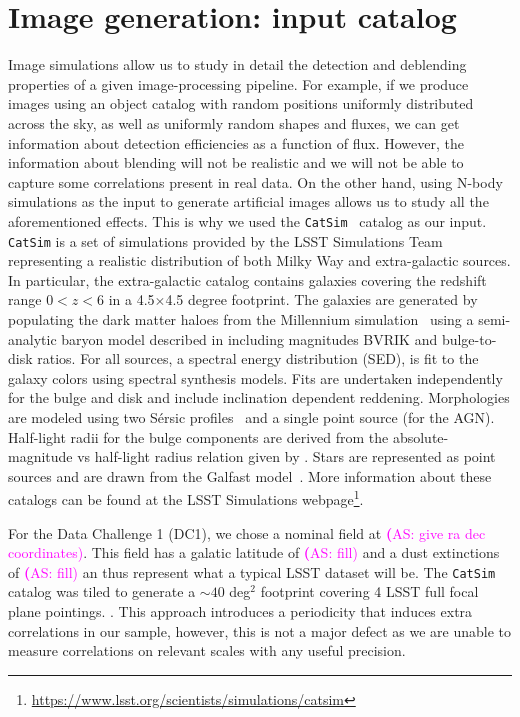 \documentclass[twocolumn]{aastex62}
\newcommand{\as}[1]{{\textcolor{magenta}{{\textbf (AS: #1)}}}}
\begin{document}
\section{Image generation: input catalog}
\label{sec:inputs}
Image simulations allow us to study in detail the detection and deblending properties of a given image-processing pipeline. For example, if we produce images using an object catalog with random positions uniformly distributed across the sky, as well as uniformly random shapes and fluxes, we can get information about detection efficiencies as a function of flux.  However, the information about blending will not be realistic and we will not be able to capture some correlations present in real data. On the other hand, using N-body simulations as the input to generate artificial images allows us to study all the aforementioned effects. This is why we used the \texttt{CatSim}~\citep{2010SPIE.7738E..1OC,2014SPIE.9150E..14C} catalog as our input.  \texttt{CatSim} is a set of simulations provided by the LSST Simulations Team representing a realistic distribution of both Milky Way and extra-galactic sources. In particular, the extra-galactic catalog contains galaxies covering the redshift range $0 < z < 6$ in a 4.5$\times$4.5 degree footprint. The galaxies are generated by populating the dark matter haloes from the Millennium simulation~\citep{2005Nature.435.629S} using a semi-analytic baryon model described in \citet{2006MNRAS.366..499D} including magnitudes BVRIK and bulge-to-disk ratios. For all sources, a spectral energy distribution (SED), is fit to the galaxy colors using \citet{2003MNRAS.344.1000B} spectral synthesis models. Fits are undertaken independently for the bulge and disk and include inclination dependent reddening. Morphologies are modeled using two S\'{e}rsic profiles~\citep{1963BAAA....6...41S} and a single point source (for the AGN). Half-light radii for the bulge components are derived from the absolute-magnitude vs half-light radius relation given by \citet{2011A&A...534A...3G}. Stars are represented as point sources and are drawn from the Galfast model~\citep{2008ApJ...673..864J}. More information about these catalogs can be found at the LSST Simulations webpage\footnote{\url{https://www.lsst.org/scientists/simulations/catsim}}.

For the Data Challenge 1 (DC1), we chose a nominal field at \as{give ra dec coordinates}. This field has a galatic latitude of \as{fill} and a dust extinctions of \as{fill} an thus represent what a typical LSST dataset will be. The \texttt{CatSim} catalog was tiled to generate a $\sim 40$ deg$^{2}$ footprint covering 4 LSST full focal plane pointings. . This approach introduces a periodicity that induces extra correlations in our sample, however, this is not a major defect as we are unable to measure correlations on relevant scales with any useful precision.
\end{document}
